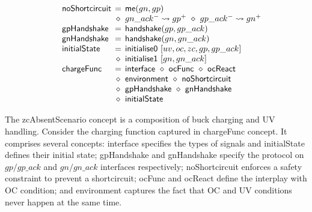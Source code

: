 \documentclass[british, journal]{IEEEtran}
\begin{document}
\[\begin{array}{lcl}
~~~~\mathsf{\mathsf{noShortcircuit}}&\hspace{-2mm}=&\hspace{-2mm}\mathsf{me}(gn, gp)\\
~&\hspace{-2mm}\diamond&\hspace{-2mm}gn\_ack^{-}\rightsquigarrow gp^{+}~\diamond~gp\_ack^{-}\rightsquigarrow gn^{+}\\

~~~~\mathsf{gpHandshake}&\hspace{-2mm}=&\hspace{-2mm}\mathsf{handshake}(gp,gp\_ack)\\

~~~~\mathsf{gnHandshake}&\hspace{-2mm}=&\hspace{-2mm}\mathsf{handshake}(gn,gn\_ack)\\

~~~~\mathsf{initialState}&\hspace{-2mm}=&\hspace{-2mm}\mathsf{initialise0}~[uv,oc,zc,gp,gp\_ack]\\
~&\hspace{-2mm}\diamond&\hspace{-2mm}\mathsf{initialise1}~[gn,gn\_ack]\\

~~~~\mathsf{chargeFunc}&\hspace{-2mm}=&\hspace{-2mm}\mathsf{interface}~\diamond~\mathsf{ocFunc}~\diamond~\mathsf{ocReact}\\
~&\hspace{-2mm}\diamond&\hspace{-2mm}\mathsf{environment}~\diamond~\mathsf{noShortcircuit}\\
~&\hspace{-2mm}\diamond&\hspace{-2mm}\mathsf{gpHandshake}~\diamond~\mathsf{gnHandshake}\\
~&\hspace{-2mm}\diamond&\hspace{-2mm}\mathsf{initialState}

\end{array}
\]

The \textsf{zcAbsentScenario} concept is a composition of buck charging and UV handling.
Consider the charging function captured in \textsf{chargeFunc} concept.
It comprises several concepts: \textsf{interface} specifies the types
of signals and \textsf{initialState} defines their initial state;
\textsf{gpHandshake} and \textsf{gnHandshake} specify the protocol on $gp/gp\_ack$
and $gn/gn\_ack$ interfaces respectively;
\textsf{noShortcircuit} enforces a safety constraint to prevent a shortcircuit;
\textsf{ocFunc} and \textsf{ocReact} define the interplay with OC condition;
and \textsf{environment} captures the fact that OC and UV conditions never happen at the same time.
\end{document}
